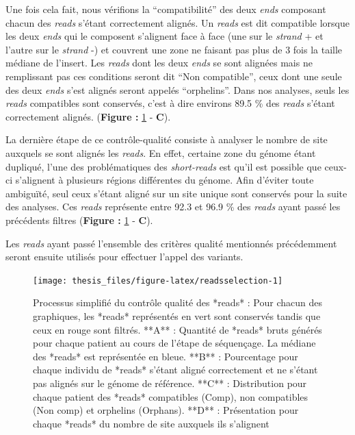 \documentclass[12pt,twoside]{reedthesis}
\theoremstyle{definition}
\theoremstyle{definition}
\theoremstyle{remark}
\begin{document}
  Une fois cela fait, nous vérifions la ``compatibilité'' des deux
  \emph{ends} composant chacun des \emph{reads} s'étant correctement
  alignés. Un \emph{reads} est dit compatible lorsque les deux \emph{ends}
  qui le composent s'alignent face à face (une sur le \emph{strand} + et
  l'autre sur le \emph{strand} -) et couvrent une zone ne faisant pas plus
  de 3 fois la taille médiane de l'insert. Les \emph{reads} dont les deux
  \emph{ends} se sont alignées mais ne remplissant pas ces conditions
  seront dit ``Non compatible'', ceux dont une seule des deux \emph{ends}
  s'est alignés seront appelés ``orphelins''. Dans nos analyses, seuls les
  \emph{reads} compatibles sont conservés, c'est à dire environs 89.5 \%
  des \emph{reads} s'étant correctement alignés. (\textbf{Figure :
  }\ref{fig:readsselection} - \textbf{C}).
  
  La dernière étape de ce contrôle-qualité consiste à analyser le nombre
  de site auxquels se sont alignés les \emph{reads}. En effet, certaine
  zone du génome étant dupliqué, l'une des problématiques des
  \emph{short-reads} est qu'il est possible que ceux-ci s'alignent à
  plusieurs régions différentes du génome. Afin d'éviter toute ambiguïté,
  seul ceux s'étant aligné sur un site unique sont conservés pour la suite
  des analyses. Ces \emph{reads} représente entre 92.3 et 96.9 \% des
  \emph{reads} ayant passé les précédents filtres (\textbf{Figure :
  }\ref{fig:readsselection} - \textbf{C}).
  
  Les \emph{reads} ayant passé l'ensemble des critères qualité mentionnés
  précédemment seront ensuite utilisés pour effectuer l'appel des
  variants.
  
  \newpage
  
  \begin{figure}
  
  {\centering \texttt{[image: thesis\_files/figure-latex/readsselection-1]} 
  
  }
  
  \caption[Processus simplifié du contrôle qualité des *reads*]{Processus simplifié du contrôle qualité des *reads* : Pour chacun des graphiques, les *reads* représentés en vert sont conservés tandis que ceux en rouge sont filtrés. **A** : Quantité de *reads* bruts générés pour chaque patient au cours de l'étape de séquençage. La médiane des *reads* est représentée en bleue. **B** : Pourcentage pour chaque individu de *reads* s'étant aligné correctement et ne s'étant pas alignés sur le génome de référence. **C** : Distribution pour chaque patient des *reads* compatibles (Comp), non compatibles (Non comp) et orphelins (Orphans). **D** : Présentation pour chaque *reads* du nombre de site auxquels ils s'alignent}\label{fig:readsselection}
  \end{figure}
  
\end{document}

